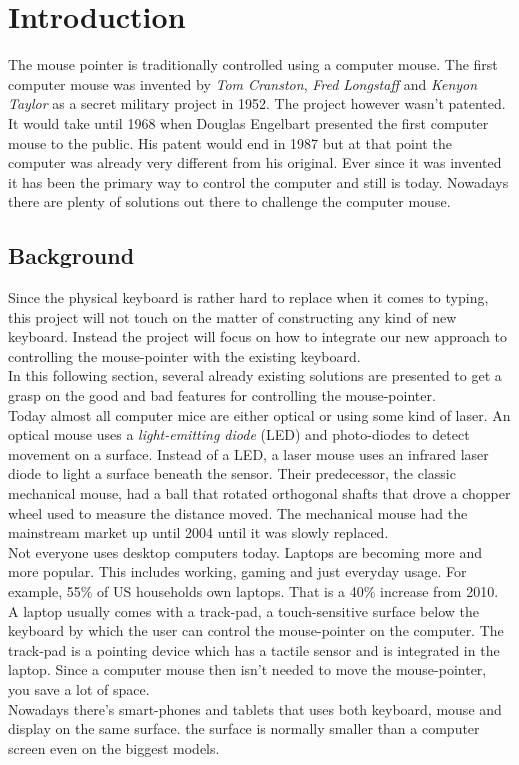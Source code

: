 \chapter{Introduction}
The mouse pointer is traditionally controlled using a computer mouse.
The first computer mouse was invented by \emph{Tom Cranston}, \emph{Fred Longstaff} and 
\emph{Kenyon Taylor} as a secret military project in 1952. The project however wasn't 
patented. It would take until 1968 when Douglas Engelbart presented the 
first computer mouse to the public. His patent would end in 1987 but at that point the 
computer was already very different from his original. Ever since
it was invented it has been the primary way to control the computer and still is today. Nowadays
there are plenty of solutions out there to challenge the computer mouse.

\section{Background}
Since the physical keyboard is rather hard to replace when it comes to typing, this project
will not touch on the matter of constructing any kind of new keyboard. Instead the project
will focus on how to integrate our new approach to controlling the mouse-pointer with the existing
keyboard.\\
In this following section, several already existing solutions are presented to get a grasp
on the good and bad features for controlling the mouse-pointer.\\
Today almost all computer mice are either optical or using some kind of laser. An optical
mouse uses a \emph{light-emitting diode} (LED) and photo-diodes to detect movement on a
surface. Instead of a LED, a laser mouse uses an infrared laser diode to light a surface
beneath the sensor. Their predecessor, the classic mechanical mouse, had a ball that rotated
orthogonal shafts that drove a chopper wheel used to measure the distance moved. The mechanical
mouse had the mainstream market up until 2004 until it was slowly replaced.\\
Not everyone uses desktop computers today. Laptops are becoming more and more popular.
This includes working, gaming and just everyday usage. For example, 55\% of US households
own laptops. That is a 40\% increase from 2010.\\
A laptop usually comes with a track-pad, a touch-sensitive surface below the keyboard
by which the user can control the mouse-pointer on the computer.
The track-pad is a pointing device which has a tactile sensor and is
integrated in the laptop. Since a computer mouse then isn't needed to move
the mouse-pointer, you save a lot of space.\\
Nowadays there's smart-phones and tablets that uses both keyboard, mouse
and display on the same surface. the surface is normally smaller than a computer screen
even on the biggest models.

